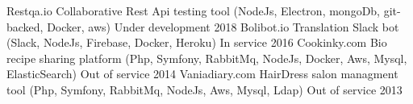 
\begin{cvhonors}

  \cvhonor
    {Restqa.io} %
    {Collaborative Rest Api testing tool (NodeJs, Electron, mongoDb, git-backed, Docker, aws)} %
    {Under development} %
    {2018} %
  \cvhonor
    {Bolibot.io} %
    {Translation Slack bot (Slack, NodeJs, Firebase, Docker, Heroku)} %
    {In service} %
    {2016} %
  \cvhonor
    {Cookinky.com} %
    {Bio recipe sharing platform (Php, Symfony, RabbitMq, NodeJs,  Docker, Aws, Mysql, ElasticSearch)} %
    {Out of service} %
    {2014} %
  \cvhonor
    {Vaniadiary.com} %
    {HairDress salon managment tool (Php, Symfony, RabbitMq, NodeJs, Aws, Mysql, Ldap)} %
    {Out of service} %
    {2013} %

\end{cvhonors}

